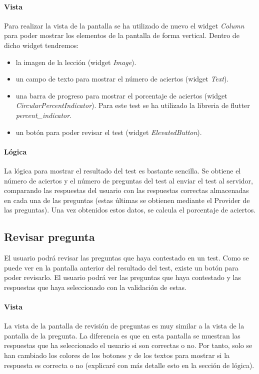 \paragraph*{Vista}
\label{sec:vista}

Para realizar la vista de la pantalla se ha utilizado de nuevo el widget \textit{Column} para poder mostrar los elementos de la pantalla de forma vertical. 
Dentro de dicho widget tendremos:
\begin{itemize}
  \item la imagen de la lección (widget \textit{Image}).
  \item un campo de texto para mostrar el número de aciertos (widget \textit{Text}).
  \item una barra de progreso para mostrar el porcentaje de aciertos (widget \textit{CircularPercentIndicator}). Para este test se ha utilizado la libreria de flutter \textit{percent\_indicator}.
  \item un botón para poder revisar el test (widget \textit{ElevatedButton}).
\end{itemize}

\paragraph*{Lógica}
\label{sec:logica}
La lógica para mostrar el resultado del test es bastante sencilla. Se obtiene el número de aciertos y el número de preguntas del test al enviar el test al servidor, comparando las respuestas del usuario con las respuestas correctas almacenadas en cada una de las preguntas (estas últimas se obtienen mediante el Provider de las preguntas). 
Una vez obtenidos estos datos, se calcula el porcentaje de aciertos.



\subsection{Revisar pregunta}
\label{sec:pregunta}
El usuario podrá revisar las preguntas que haya contestado en un test. Como se puede ver en la pantalla anterior del resultado del test, existe un botón para poder revisarlo. El usuario podrá ver las preguntas que haya contestado y las respuestas que haya seleccionado con la validación de estas.

\paragraph*{Vista}
\label{sec:vista}
La vista de la pantalla de revisión de preguntas es muy similar a la vista de la pantalla de la pregunta. La diferencia es que en esta pantalla se muestran las respuestas que ha seleccionado el usuario si son correctas o no.
Por tanto, solo se han cambiado los colores de los botones y de los textos para mostrar si la respuesta es correcta o no (explicaré con más detalle esto en la sección de lógica).


